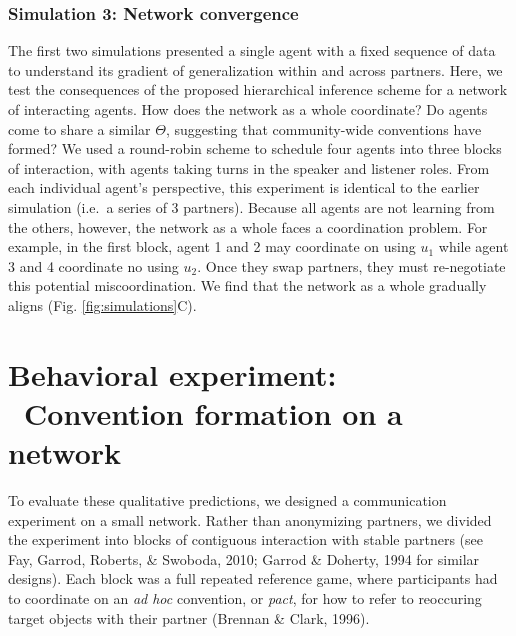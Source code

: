 \documentclass[10pt, letterpaper]{article}
\begin{document}
\hypertarget{simulation-3-network-convergence}{%
\subsubsection{Simulation 3: Network
convergence}\label{simulation-3-network-convergence}}

The first two simulations presented a single agent with a fixed sequence
of data to understand its gradient of generalization within and across
partners. Here, we test the consequences of the proposed hierarchical
inference scheme for a network of interacting agents. How does the
network as a whole coordinate? Do agents come to share a similar
\(\Theta\), suggesting that community-wide conventions have formed? We
used a round-robin scheme to schedule four agents into three blocks of
interaction, with agents taking turns in the speaker and listener roles.
From each individual agent's perspective, this experiment is identical
to the earlier simulation (i.e.~a series of 3 partners). Because all
agents are not learning from the others, however, the network as a whole
faces a coordination problem. For example, in the first block, agent 1
and 2 may coordinate on using \(u_1\) while agent 3 and 4 coordinate no
using \(u_2\). Once they swap partners, they must re-negotiate this
potential miscoordination. We find that the network as a whole gradually
aligns (Fig. \ref{fig:simulations}C).

\hypertarget{behavioral-experiment-convention-formation-on-a-network}{%
\section{Behavioral experiment: ~Convention formation on a
network}\label{behavioral-experiment-convention-formation-on-a-network}}

To evaluate these qualitative predictions, we designed a communication
experiment on a small network. Rather than anonymizing partners, we
divided the experiment into blocks of contiguous interaction with stable
partners (see Fay, Garrod, Roberts, \& Swoboda, 2010; Garrod \& Doherty,
1994 for similar designs). Each block was a full repeated reference
game, where participants had to coordinate on an \emph{ad hoc}
convention, or \emph{pact}, for how to refer to reoccuring target
objects with their partner (Brennan \& Clark, 1996).
\end{document}
